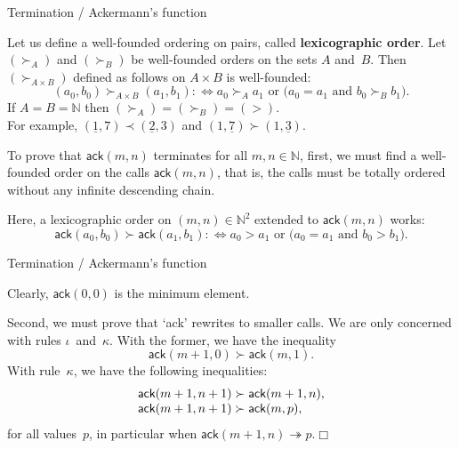\documentclass[compress,dvipdfmx]{beamer}
\newcommand\fun[1]{\textsf{#1}}
\begin{document}
%
\begin{frame}{Termination / Ackermann's function}

Let us define a well\hyp{}founded ordering on pairs, called
\textbf{lexicographic order}. Let \((\succ_A)\) and \((\succ_B)\) be
well\hyp{}founded orders on the sets \(A\) and~\(B\). Then \((\succ_{A
  \times B})\) defined as follows on \(A \times B\) is
well\hyp{}founded:
\begin{equation*}
(a_0,b_0) \succ_{A \times B} (a_1,b_1) :\Leftrightarrow \text{\(a_0
    \succ_A a_1\) or (\(a_0 = a_1\) and \(b_0 \succ_B b_1\)).}
\end{equation*}
If \(A=B=\mathbb{N}\) then \((\succ_A) = (\succ_B) = (>)\). \\ For
example, \((\underline{1},7) \prec (\underline{2},3)\) and
\((1,\underline{7}) \succ (1,\underline{3})\).

\bigskip

To prove that \(\fun{ack}(m,n)\) terminates for all \(m,n \in
\mathbb{N}\), first, we must find a well\hyp{}founded order on the
calls \(\fun{ack}(m,n)\), that is, the calls must be totally ordered
without any infinite descending chain.

\bigskip

Here, a lexicographic order on \((m,n) \in \mathbb{N}^2\) extended to
\(\fun{ack}(m,n)\) works:
\begin{equation*}
\fun{ack}(a_0,b_0) \succ \fun{ack}(a_1,b_1) :\Leftrightarrow
\text{\(a_0 > a_1\) or (\(a_0 = a_1\) and \(b_0 > b_1\)).}
\end{equation*}

\end{frame}

%
\begin{frame}{Termination / Ackermann's function}

  Clearly, \(\fun{ack}(0,0)\) is the minimum element.

  \bigskip

  Second, we must prove that `\fun{ack}' rewrites to smaller calls. We
  are only concerned with rules \(\iota\)~and~\(\kappa\). With the
  former, we have the inequality
  \begin{equation*}
    \fun{ack}(m+1,0) \succ \fun{ack}(m,1).
  \end{equation*}
  With rule~\(\kappa\), we have the following inequalities:
  \begin{equation*}
    \begin{array}{@{}r@{\;}l@{\;}l@{}}
      \fun{ack}(m+1,n+1) & \succ & \fun{ack}(m+1,n),\\
      \fun{ack}(m+1,n+1) & \succ & \fun{ack}(m,p),
    \end{array}
  \end{equation*}
  for all values~\(p\), in particular when \(\fun{ack}(m+1,n)
  \twoheadrightarrow p\).\hfill\(\Box\)

\end{frame}
\end{document}
